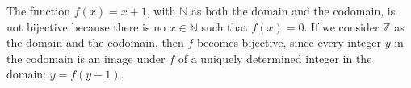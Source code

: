 \exercise
The function $f(x)=x+1$, with $\mathbb{N}$ as both the domain and the codomain, is not bijective because there is no $x\in\mathbb{N}$ such that $f(x)=0$.
If we consider $\mathbb{Z}$ as the domain and the codomain, then $f$ becomes bijective, since every integer $y$ in the codomain is an image under $f$ of a uniquely determined integer in the domain: $y=f(y-1)$.
